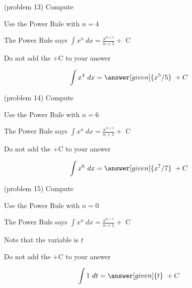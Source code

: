 \documentclass{ximera}
\begin{document}
\begin{problem}(problem 13)
Compute 

\begin{hint}
Use the Power Rule with $n=4$
\end{hint}
\begin{hint}
The Power Rule says $\int x^n \ dx = \frac{x^{n+1}}{n+1} +$ C
\end{hint}
\begin{hint}
\begin{center}
Do not add the +C to your answer
\end{center}
\end{hint}

\[
\int x^4 \ dx =
\answer[given]{x^5 /5} \ + C
\]
\end{problem}


\begin{problem}(problem 14)
Compute 

\begin{hint}
Use the Power Rule with $n=6$
\end{hint}
\begin{hint}
The Power Rule says $\int x^n \ dx = \frac{x^{n+1}}{n+1} +$ C
\end{hint}
\begin{hint}
\begin{center}
Do not add the +C to your answer
\end{center}
\end{hint}

\[
\int x^6 \ dx =
\answer[given]{x^7 /7} \ + C
\]
\end{problem}



\begin{problem}(problem 15)
Compute 


\begin{hint}
Use the Power Rule with $n=0$
\end{hint}
\begin{hint}
The Power Rule says $\int x^n \ dx = \frac{x^{n+1}}{n+1} +$ C
\end{hint}
\begin{hint}
Note that the variable is $t$
\end{hint}
\begin{hint}
\begin{center}
Do not add the +C to your answer
\end{center}
\end{hint}

\[
\int 1 \ dt =
\answer[given]{t} \ + C
\]
\end{problem}
\end{document}
